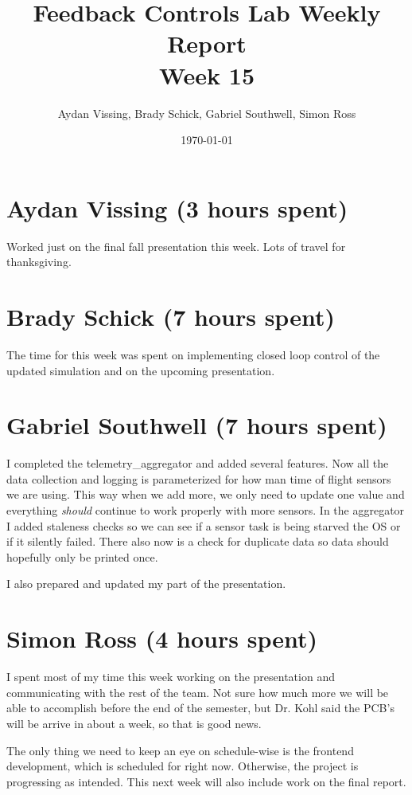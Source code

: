 \documentclass[12pt, titlepage]{article}
\title{Feedback Controls Lab Weekly Report \\ \normalsize{Week 15}}
\author{Aydan Vissing, Brady Schick, Gabriel Southwell, Simon Ross}
\date{\today}
\begin{document}
\maketitle

\section*{Aydan Vissing (3 hours spent)}

Worked just on the final fall presentation this week. Lots of travel for thanksgiving. 

\section*{Brady Schick (7 hours spent)}

The time for this week was spent on implementing closed loop control of the updated simulation and on the upcoming presentation.

\section*{Gabriel Southwell (7 hours spent)}

I completed the telemetry\_aggregator and added several features. Now all the data collection and logging is parameterized for how man time of flight sensors we are using. This way when we add more, we only need to update one value and everything \textit{should} continue to work properly with more sensors. In the aggregator I added staleness checks so we can see if a sensor task is being starved the OS or if it silently failed. There also now is a check for duplicate data so data should hopefully only be printed once. 

I also prepared and updated my part of the presentation.

\section*{Simon Ross (4 hours spent)}

I spent most of my time this week working on the presentation and communicating with the rest of the team. Not sure how much more we will be able to accomplish before the end of the semester, but Dr. Kohl said the PCB's will be arrive in about a week, so that is good news.

The only thing we need to keep an eye on schedule-wise is the frontend development, which is scheduled for right now. Otherwise, the project is progressing as intended. This next week will also include work on the final report.
\end{document}

